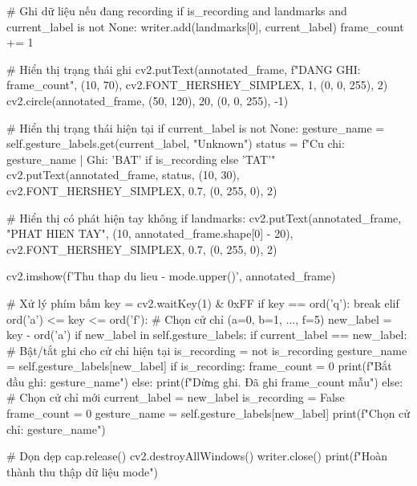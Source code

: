 \begin{aivncodebox}
\begin{python}
            # Ghi dữ liệu nếu đang recording
            if is_recording and landmarks and current_label is not None:
                writer.add(landmarks[0], current_label)
                frame_count += 1
                
                # Hiển thị trạng thái ghi
                cv2.putText(annotated_frame, f"DANG GHI: {frame_count}", 
                           (10, 70), cv2.FONT_HERSHEY_SIMPLEX, 1, (0, 0, 255), 2)
                cv2.circle(annotated_frame, (50, 120), 20, (0, 0, 255), -1)
            
            # Hiển thị trạng thái hiện tại
            if current_label is not None:
                gesture_name = self.gesture_labels.get(current_label, "Unknown")
                status = f"Cu chi: {gesture_name} | Ghi: {'BAT' if is_recording else 'TAT'}"
                cv2.putText(annotated_frame, status, (10, 30),
                           cv2.FONT_HERSHEY_SIMPLEX, 0.7, (0, 255, 0), 2)
            
            # Hiển thị có phát hiện tay không
            if landmarks:
                cv2.putText(annotated_frame, "PHAT HIEN TAY", 
                           (10, annotated_frame.shape[0] - 20),
                           cv2.FONT_HERSHEY_SIMPLEX, 0.7, (0, 255, 0), 2)
            
            cv2.imshow(f'Thu thap du lieu - {mode.upper()}', annotated_frame)
            
            # Xử lý phím bấm
            key = cv2.waitKey(1) & 0xFF
            if key == ord('q'):
                break
            elif ord('a') <= key <= ord('f'):
                # Chọn cử chỉ (a=0, b=1, ..., f=5)
                new_label = key - ord('a')
                if new_label in self.gesture_labels:
                    if current_label == new_label:
                        # Bật/tắt ghi cho cử chỉ hiện tại
                        is_recording = not is_recording
                        gesture_name = self.gesture_labels[new_label]
                        if is_recording:
                            frame_count = 0
                            print(f"Bắt đầu ghi: {gesture_name}")
                        else:
                            print(f"Dừng ghi. Đã ghi {frame_count} mẫu")
                    else:
                        # Chọn cử chỉ mới
                        current_label = new_label
                        is_recording = False
                        frame_count = 0
                        gesture_name = self.gesture_labels[new_label]
                        print(f"Chọn cử chỉ: {gesture_name}")
        
        # Dọn dẹp
        cap.release()
        cv2.destroyAllWindows()
        writer.close()
        print(f"Hoàn thành thu thập dữ liệu {mode}")
\end{python}
\end{aivncodebox}

